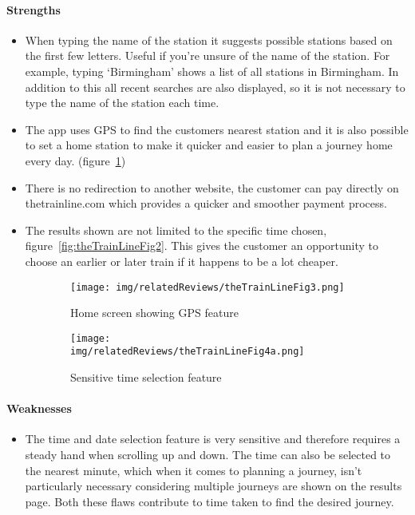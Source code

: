 \paragraph{Strengths}

\begin{itemize}
	\item When typing the name of the station it suggests possible stations
		based on the first few letters. Useful if you're unsure of the name of
		the station. For example, typing `Birmingham' shows a list of all
		stations in Birmingham. In addition to this all recent searches are
		also displayed, so it is not necessary to type the name of the station
		each time.
	\item The app uses GPS to find the customers nearest station and it is also
		possible to set a home station to make it quicker and easier to plan a
		journey home every day. (figure~\ref{fig:thetrainline3})
	\item There is no redirection to another website, the customer can pay
		directly on thetrainline.com which provides a quicker and smoother
		payment process.
	\item The results shown are not limited to the specific time chosen,
		figure~\ref{fig:theTrainLineFig2}. This gives the customer an
		opportunity to choose an earlier or later train if it happens to be a
		lot cheaper.
\end{itemize}
\begin{figure}[htbp]
	\centering
	\begin{subfigure}[b]{0.33\textwidth}
		\texttt{[image: img/relatedReviews/theTrainLineFig3.png]}
		\caption{Home screen showing GPS feature}
	\end{subfigure}%
	\qquad
	\begin{subfigure}[b]{0.33\textwidth}
		\texttt{[image: img/relatedReviews/theTrainLineFig4a.png]}
		\caption{Sensitive time selection feature}
	\end{subfigure}
	\caption{}\label{fig:thetrainline3}
\end{figure}

\paragraph{Weaknesses}
\begin{itemize}
	\item The time and date selection feature is very sensitive and therefore
		requires a steady hand when scrolling up and down. The time can also be
		selected to the nearest minute, which when it comes to planning a
		journey, isn't particularly necessary considering multiple journeys are
		shown on the results page. Both these flaws contribute to time taken to
		find the desired journey.
\end{itemize}

